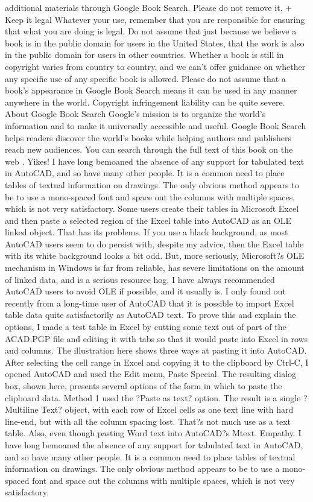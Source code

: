 \documentclass[a4paper]{article}
\begin{document}
additional materials through Google Book Search. Please do not remove it. 
+ Keep it legal Whatever your use, remember that you are responsible for ensuring that what you are doing is legal. Do not assume that just 
because we believe a book is in the public domain for users in the United States, that the work is also in the public domain for users in other 
countries. Whether a book is still in copyright varies from country to country, and we can't offer guidance on whether any specific use of 
any specific book is allowed. Please do not assume that a book's appearance in Google Book Search means it can be used in any manner 
anywhere in the world. Copyright infringement liability can be quite severe. 
About Google Book Search 
Google's mission is to organize the world's information and to make it universally accessible and useful. Google Book Search helps readers 
discover the world's books while helping authors and publishers reach new audiences. You can search through the full text of this book on the web . Yikes! I have long bemoaned the absence of any support for tabulated text in AutoCAD, and so have many other people. It is a common need to place tables of textual information on drawings. The only obvious method appears to be to use a mono-spaced font and space out the columns with multiple spaces, which is not very satisfactory.
Some users create their tables in Microsoft Excel and then paste a selected region of the Excel table into AutoCAD as an OLE linked object. That has its problems. If you use a black background, as most AutoCAD users seem to do persist with, despite my advice, then the Excel table with its white background looks a bit odd. But, more seriously, Microsoft?s OLE mechanism in Windows is far from reliable, has severe limitations on the amount of linked data, and is a serious resource hog. I have always recommended AutoCAD users to avoid OLE if possible, and it usually is.
I only found out recently from a long-time user of AutoCAD that it is possible to import Excel table data quite satisfactorily as AutoCAD text. To prove this and explain the options, I made a test table in Excel by cutting some text out of part of the ACAD.PGP file and editing it with tabs so that it would paste into Excel in rows and columns. The illustration here shows three ways at pasting it into AutoCAD. After selecting the cell range in Excel and copying it to the clipboard by Ctrl-C, I opened AutoCAD and used the Edit menu, Paste Special. The resulting dialog box, shown here, presents several options of the form in which to paste the clipboard data.
Method 1 used the ?Paste as text? option. The result is a single ?Multiline Text? object, with each row of Excel cells as one text line with hard line-end, but with all the column spacing lost. That?s not much use as a text table. Also, even though pasting Word text into AutoCAD?s Mtext. Empathy. I have long bemoaned the absence of any support for tabulated text in AutoCAD, and so have many other people. It is a common need to place tables of textual information on drawings. The only obvious method appears to be to use a mono-spaced font and space out the columns with multiple spaces, which is not very satisfactory.
\end{document}
